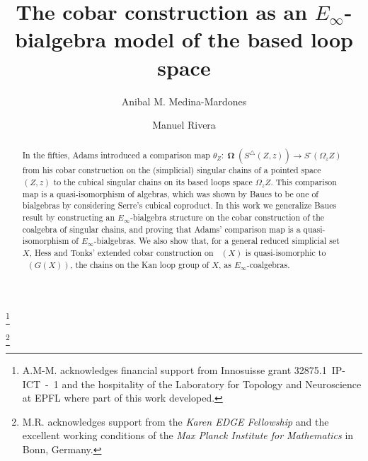 \documentclass{amsart}
\newcommand{\simplex}{\triangle}
\newcommand{\cube}{\square}
\DeclareMathOperator{\schains}{N^{\simplex}}
\DeclareMathOperator{\cobar}{\mathbf{\Omega}}
\theoremstyle{definition}
\begin{document}
\title{The cobar construction as an $E_{\infty}$-bialgebra model of the based loop space}
\author{Anibal M. Medina-Mardones}
\address{Max Plank Institute for Mathematics, Bonn, Germany}
\address{Department of Mathematics, University of Notre Dame, Notre Dame, IN, USA}
\thanks{A.M-M. acknowledges financial support from Innosuisse grant \mbox{32875.1 IP-ICT - 1} and the hospitality of the Laboratory for Topology and Neuroscience at EPFL where part of this work developed.}
\author{Manuel Rivera}
\address{Department of Mathematics, Purdue University, West Lafayette, IN, USA}
\thanks{M.R. acknowledges support from the \textit{Karen EDGE Fellowship} and the excellent working conditions of the \textit{Max Planck Institute for Mathematics} in Bonn, Germany.}


\begin{abstract}
    In the fifties, Adams introduced a comparison map $\theta_Z \colon \cobar(S^\simplex(Z,z)) \to S^\cube(\Omega_z Z)$ from his cobar construction on the (simplicial) singular chains of a pointed space $(Z, z)$ to the cubical singular chains on its based loops space $\Omega_z Z$.
	This comparison map is a quasi-isomorphism of algebras, which was shown by Baues to be one of bialgebras by considering Serre's cubical coproduct.
	In this work we generalize Baues result by constructing an $E_{\infty}$-bialgebra structure on the cobar construction of the coalgebra of singular chains, and proving that Adams' comparison map is a quasi-isomorphism of $E_{\infty}$-bialgebras.
	We also show that, for a general reduced simplicial set $X$, Hess and Tonks' extended cobar construction on $\schains(X)$ is quasi-isomorphic to $\schains(G(X))$, the chains on the Kan loop group of $X$, as $E_{\infty}$-coalgebras. 
\end{abstract}

\vspace*{-1cm}

\maketitle
\setcounter{tocdepth}{1}
\tableofcontents








\end{document}
